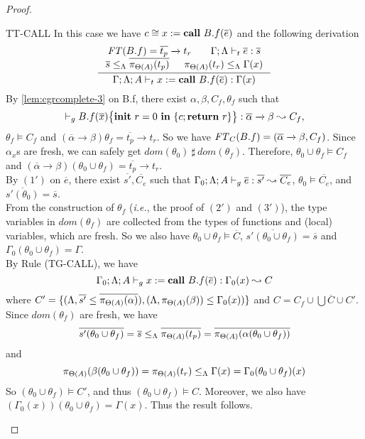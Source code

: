 {{{\begin{proof}
\begin{ProofEnumDesc}
\item[TT-CALL] In this case we have $c\cong \lcCALL{x}{B.f}{\overline{e}}$ and the following derivation
\begin{equation*}
\inference
{
\FT(B.f) = \overline{t_p} \xrightarrow{} t_r  &
\Gamma;\trace \vdash_{t} \overline{e} : \overline{s}\\
\overline{s}\leq_{\trace} \overline{\app{t_p}{\Theta(A)}} &
\app{t_r}{\Theta(A)}\leq_{\trace} \Gamma(x)
}
{\Gamma;\trace; A \vdash_{t} \lcCALL{x}{B.f}{\overline{e}} : \Gamma(x)}
\end{equation*}
By \ref{lem:cgrcomplete-3} on B.f, there exist $\alpha,\beta, C_{f}, \theta_{f}$ such that
$$
\vdash_{g}\lpPROG{B.f}{\overline{x}}{c}{\lpRES}:  \overline{\alpha}\xrightarrow{} \beta \leadsto C_{f},
$$
$\theta_f \vDash C_f $ and $(\overline{\alpha}\xrightarrow{} \beta)\theta_{f} = \overline{t_p}\xrightarrow{} t_r$. So we have $\FT_C(B.f) =(\overline{\alpha}\xrightarrow{} \beta, C_{f}) $.
Since $\alpha_{x}$s are fresh, we can safely get $dom(\theta_{0}) ~\sharp~ dom(\theta_f)$.
Therefore, $\theta_{0}\cup\theta_f \vDash C_{f}$ and $(\overline{\alpha}\xrightarrow{} \beta)(\theta_{0}\cup\theta_{f}) = \overline{t_p}\xrightarrow{} t_r$.\\
By $(1')$ on $\overline{e}$, there exist $\overline{s'}, \overline{C_{e}}$ such that
$\Gamma_{0};\trace; A \vdash_{g} \overline{e} : \overline{s'}\leadsto \overline{C_e}$, $\theta_{0} \vDash \overline{C_e} $, and $\overline{s'(\theta_{0})} = \overline{s}$.\\
From the construction of $\theta_f$ (\emph{i.e.}, the proof of $(2')$ and $(3')$), the type variables in $dom(\theta_f)$ are collected from the types of functions and (local) variables, which are fresh.
So we also have $\theta_{0}\cup \theta_f \vDash \overline{C}$,  $\overline{s'(\theta_{0}\cup\theta_f)} = \overline{s}$ and $\Gamma_{0}(\theta_{0}\cup \theta_f) = \Gamma$. \\
By Rule {(TG-CALL)}, we have
\begin{equation*}
\Gamma_{0};\trace; A \vdash_{g} \lcCALL{x}{B.f}{\overline{e}} : \Gamma_{0}(x) \leadsto C
\end{equation*}
where $C'= \{(\trace, \overline{s'}\leq \overline{\app{\alpha}{\Theta(A)}}), (\trace, \app{\beta}{\Theta(A)}) \leq \Gamma_{0}(x)) \}$ and $C = C_{f} \cup \bigcup\overline{C} \cup C'$.
Since $dom(\theta_f)$ are fresh, we have
\begin{equation*}
\overline{s'(\theta_{0}\cup \theta_f)} = \overline{s} \leq_{\trace} \overline{\app{t_p}{\Theta(A)}} = \overline{\app{\alpha(\theta_{0}\cup \theta_f)}{\Theta(A)}}
\end{equation*}
and
\begin{equation*}
\app{\beta(\theta_{0}\cup \theta_f)}{\Theta(A)} =  \app{t_r}{\Theta(A)}
\leq_{\trace} \Gamma(x) = \Gamma_{0}(\theta_{0}\cup \theta_f)(x)
\end{equation*}
So $(\theta_{0}\cup \theta_f) \vDash C'$, and thus $(\theta_{0}\cup \theta_f)\vDash C$.
Moreover, we also have
$(\Gamma_{0}(x))(\theta_0\cup\theta_f)
= \Gamma(x)$.
Thus the result follows.


\end{ProofEnumDesc}
\end{proof}}}}
